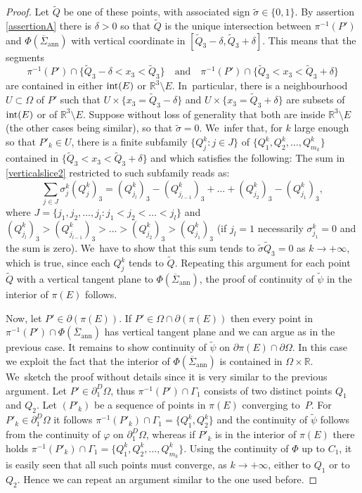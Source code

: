 \documentclass[JEP,XML,SOM,Unicode, NoFloatCountersInSection,published]{cedram}
\newcommand{\R}{\mathbb{R}}
\let\Om\Omega
\newcommand{\immclosedann}{\Phi({\overline\Sigma}_\mathrm{ann})}
\newcommand{\pointinOm}{P'}
\theoremstyle{definition}
\begin{document}
\begin{proof}
Let $\widetilde Q$
be one of these points, with associated sign $\widetilde\sigma \in \{0,1\}$.
By assertion \ref{assertionA} there is $\delta>0$
so that $\widetilde Q$ is the unique intersection between $\pi^{-1}(\pointinOm)$ and
$\immclosedann$ with vertical coordinate in $[\widetilde Q_3-\delta,\widetilde Q_3+\delta]$.
This means that the segments
\[
\pi^{-1}(\pointinOm)\cap\{\widetilde Q_3-\delta<x_3<\widetilde Q_3\}\quad\text{and}\quad \pi^{-1}(\pointinOm)\cap\{\widetilde Q_3<x_3<\widetilde Q_3+\delta\}
\]
are contained in either $\textup{int}(E)$ or
$\R^3\setminus E$. In~particular,
there is a neighbourhood $U\subset\Omega$ of $\pointinOm$ such that $U\times \{x_3=\widetilde Q_3-\delta\}$ and $U\times \{x_3=\widetilde Q_3+\delta\}$ are
subsets of $\textup{int}(E)$ or of $\R^3\setminus E$. Suppose
without loss of generality that both are inside $\R^3\setminus E$ (the other cases being
similar),
so that $\widetilde \sigma=0$. We~infer that, for $k$ large enough so that $\pointinOm_k\in U$,
there is a finite subfamily $\{Q^k_j:j\in J\}$ of $\{Q^k_1,Q^k_2,\dots,Q^k_{m_k}\}$ contained in $\{ \widetilde Q_3<x_3<\widetilde Q_3+\delta\}$ and which satisfies the following: The sum in \eqref{verticalslice2} restricted to such subfamily reads as:
\[
 \sum_{j\in J}\sigma^k_j (Q^k_j)_3=(Q^k_{j_l})_3-(Q^k_{j_{l-1}})_3+\dots+(Q^k_{j_2})_3-(Q^k_{j_1})_3,
\]
where
$J=\{j_1,j_2,\dots,j_l : j_1<j_2<\dots<j_l\}$ and $(Q^k_{j_l})_3>(Q^k_{j_{l-1}})_3>\dots>(Q^k_{j_2})_3>(Q^k_{j_1})_3$ (if $j_l=1$ necessarily $\sigma_{j_1}^k=0$ and the sum is zero). We~have to show that this sum tends to $\widetilde\sigma \widetilde Q_3=0$ as $k\to
+\infty$, which is true, since each $Q^k_j$ tends to $\widetilde Q$.
Repeating this argument for each point $\widetilde Q$
with a vertical tangent plane to $\immclosedann$,
the proof of continuity of $\widetilde\psi$ in the interior of $\pi(E)$ follows.

Now, let
$\pointinOm\in\partial(\pi(E))$. If $\pointinOm\in \Om
\cap \partial(\pi(E))$
then every point in $\pi^{-1}(\pointinOm)\cap \immclosedann$ has vertical tangent plane
and we can argue as in the previous case.
It remains to show continuity of $\widetilde \psi$
on $\partial\pi(E)\cap \partial\Omega$. In this case we
exploit the fact that the interior of
$\immclosedann$ is contained in $\Om\times \R$. We~sketch the proof without details since it is very similar to the previous argument. Let
$\pointinOm\in \partial_1^D\Om$,
thus $\pi^{-1}(\pointinOm)\cap\Gamma_1$ consists of two distinct points
$Q_1$ and $Q_2$. Let $(\pointinOm_k)$
be a sequence of points in ${\pi(E)}$
converging to~$P$.
For $\pointinOm_k \in \partial^D_1\Om$ it follows $\pi^{-1}(\pointinOm_k)
\cap\Gamma_1=\{Q^k_1,Q^k_2\}$ and the continuity of $\widetilde\psi$
follows from the continuity of $\varphi$ on $\partial^D_1\Om$,
whereas if $\pointinOm_k$
is in the interior of $\pi(E)$ there holds $\pi^{-1}(\pointinOm_k)
\cap\Gamma_1=\{Q^k_1,Q^k_2,\dots, Q^k_{m_k}\}$.
Using the continuity of $\Phi$ up to $C_1$, it is easily seen that all such points must converge,
as $k\to +\infty$, either to $Q_1$ or to $Q_2$.
Hence we can repeat an argument similar to the one used before.
\end{proof}
\end{document}
